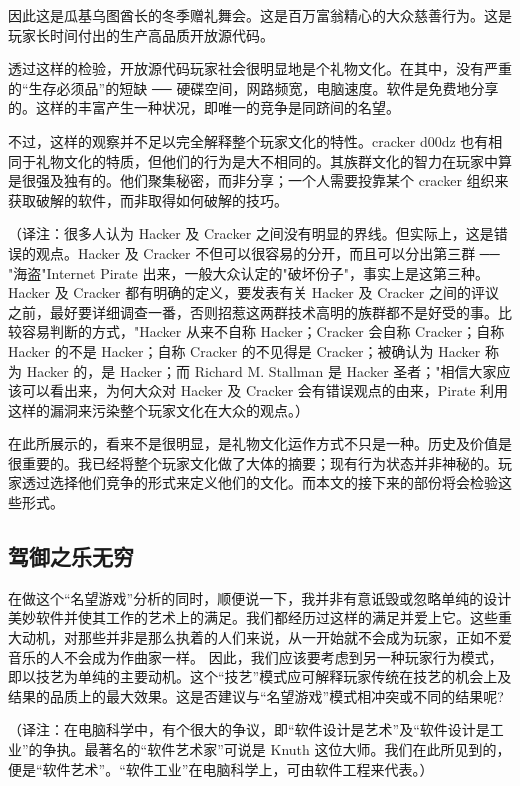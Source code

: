 因此这是瓜基乌图酋长的冬季赠礼舞会。这是百万富翁精心的大众慈善行为。这是玩家长时间付出的生产高品质开放源代码。

透过这样的检验，开放源代码玩家社会很明显地是个礼物文化。在其中，没有严重的“生存必须品”的短缺  ──  硬碟空间，网路频宽，电脑速度。软件是免费地分享的。这样的丰富产生一种状况，即唯一的竞争是同跻间的名望。

不过，这样的观察并不足以完全解释整个玩家文化的特性。cracker d00dz 也有相同于礼物文化的特质，但他们的行为是大不相同的。其族群文化的智力在玩家中算是很强及独有的。他们聚集秘密，而非分享；一个人需要投靠某个 cracker 组织来获取破解的软件，而非取得如何破解的技巧。

（译注：很多人认为 Hacker 及 Cracker 之间没有明显的界线。但实际上，这是错误的观点。Hacker 及 Cracker 不但可以很容易的分开，而且可以分出第三群 ── "海盗"Internet Pirate 出来，一般大众认定的"破坏份子"，事实上是这第三种。Hacker 及 Cracker 都有明确的定义，要发表有关 Hacker 及 Cracker 之间的评议之前，最好要详细调查一番，否则招惹这两群技术高明的族群都不是好受的事。比较容易判断的方式，"Hacker 从来不自称 Hacker；Cracker 会自称 Cracker；自称 Hacker 的不是 Hacker；自称 Cracker 的不见得是 Cracker；被确认为 Hacker 称为 Hacker 的，是 Hacker；而 Richard M. Stallman 是 Hacker 圣者；"相信大家应该可以看出来，为何大众对 Hacker 及 Cracker 会有错误观点的由来，Pirate 利用这样的漏洞来污染整个玩家文化在大众的观点。）

在此所展示的，看来不是很明显，是礼物文化运作方式不只是一种。历史及价值是很重要的。我已经将整个玩家文化做了大体的摘要；现有行为状态并非神秘的。玩家透过选择他们竞争的形式来定义他们的文化。而本文的接下来的部份将会检验这些形式。

\subsection{驾御之乐无穷}
在做这个“名望游戏”分析的同时，顺便说一下，我并非有意诋毁或忽略单纯的设计美妙软件并使其工作的艺术上的满足。我们都经历过这样的满足并爱上它。这些重大动机，对那些并非是那么执着的人们来说，从一开始就不会成为玩家，正如不爱音乐的人不会成为作曲家一样。
因此，我们应该要考虑到另一种玩家行为模式，即以技艺为单纯的主要动机。这个“技艺”模式应可解释玩家传统在技艺的机会上及结果的品质上的最大效果。这是否建议与“名望游戏”模式相冲突或不同的结果呢?

（译注：在电脑科学中，有个很大的争议，即“软件设计是艺术”及“软件设计是工业”的争执。最著名的“软件艺术家”可说是 Knuth 这位大师。我们在此所见到的，便是“软件艺术”。“软件工业”在电脑科学上，可由软件工程来代表。）

